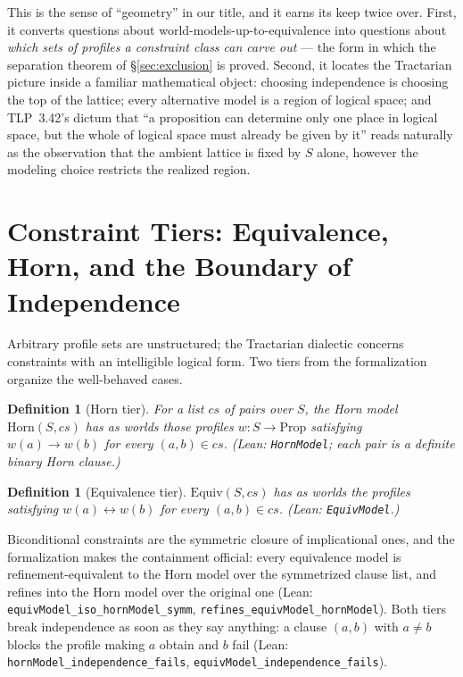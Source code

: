 \documentclass[10pt, letterpaper]{article}
\newtheorem{definition}[theorem]{Definition}
\theoremstyle{remark}
\newcommand{\lean}[1]{\texttt{#1}}
\newcommand{\TLP}[1]{TLP~#1}
\begin{document}
This is the sense of ``geometry'' in our title, and it earns its keep twice
over. First, it converts questions about world-models-up-to-equivalence into
questions about \emph{which sets of profiles a constraint class can carve
out} --- the form in which the separation theorem of \S\ref{sec:exclusion}
is proved. Second, it locates the Tractarian picture inside a familiar
mathematical object: choosing independence is choosing the top of the
lattice; every alternative model is a region of logical space; and
\TLP{3.42}'s dictum that ``a proposition can determine only one place in
logical space, but the whole of logical space must already be given by it''
reads naturally as the observation that the ambient lattice is fixed by $S$
alone, however the modeling choice restricts the realized region.

\section{Constraint Tiers: Equivalence, Horn, and the Boundary of
  Independence}\label{sec:tiers}

Arbitrary profile sets are unstructured; the Tractarian dialectic concerns
constraints with an intelligible logical form. Two tiers from the
formalization organize the well-behaved cases.

\begin{definition}[Horn tier]\label{def:horn}
For a list $\mathit{cs}$ of pairs over $S$, the \emph{Horn model}
$\mathrm{Horn}(S, \mathit{cs})$ has as worlds those profiles
$w : S \to \mathrm{Prop}$ satisfying $w(a) \to w(b)$ for every
$(a, b) \in \mathit{cs}$. (Lean: \lean{HornModel}; each pair is a definite
binary Horn clause.)
\end{definition}

\begin{definition}[Equivalence tier]\label{def:equiv}
$\mathrm{Equiv}(S, \mathit{cs})$ has as worlds the profiles satisfying
$w(a) \leftrightarrow w(b)$ for every $(a, b) \in \mathit{cs}$. (Lean:
\lean{EquivModel}.)
\end{definition}

Biconditional constraints are the symmetric closure of implicational ones,
and the formalization makes the containment official: every equivalence model
is refinement-equivalent to the Horn model over the symmetrized clause list,
and refines into the Horn model over the original one (Lean:
\lean{equivModel\_iso\_hornModel\_symm}, \lean{refines\_equivModel\_hornModel}).
Both tiers break independence as soon as they say anything: a clause
$(a, b)$ with $a \neq b$ blocks the profile making $a$ obtain and $b$ fail
(Lean: \lean{hornModel\_independence\_fails},
\lean{equivModel\_independence\_fails}).
\end{document}
